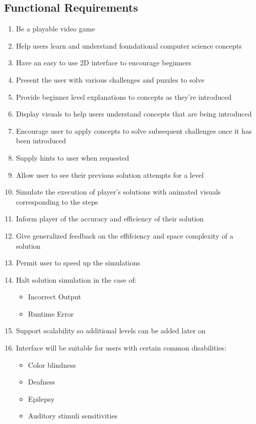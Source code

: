 \subsection{Functional Requirements}
\begin{enumerate}
	\item Be a playable video game
	\item Help users learn and understand foundational computer science 
		concepts
	\item Have an easy to use 2D interface to encourage beginners
	\item Present the user with various challenges and puzzles to solve
	\item Provide beginner level explanations to concepts as they’re introduced
	\item Display visuals to help users understand concepts that are being introduced
	\item Encourage user to apply concepts to solve subsequent challenges once it has
		been introduced
	\item Supply hints to user when requested
	\item Allow user to see their previous solution attempts for a level
	\item Simulate the execution of player’s solutions with animated visuals
		corresponding to the steps
	\item Inform player of the accuracy and efficiency of their solution
	\item Give generalized feedback on the effifciency and space complexity of a solution
	\item Permit user to speed up the simulations
	\item Halt solution simulation in the case of:
		\begin{itemize}
		\item Incorrect Output
		\item Runtime Error
		\end{itemize}
	\item Support scalability so additional levels can be added later on
	\item Interface will be suitable for users with certain common disabilities:
		\begin{itemize}
		\item Color blindness
		\item Deafness
		\item Epilepsy
		\item Auditory stimuli sensitivities
		\end{itemize}
\end{enumerate}

